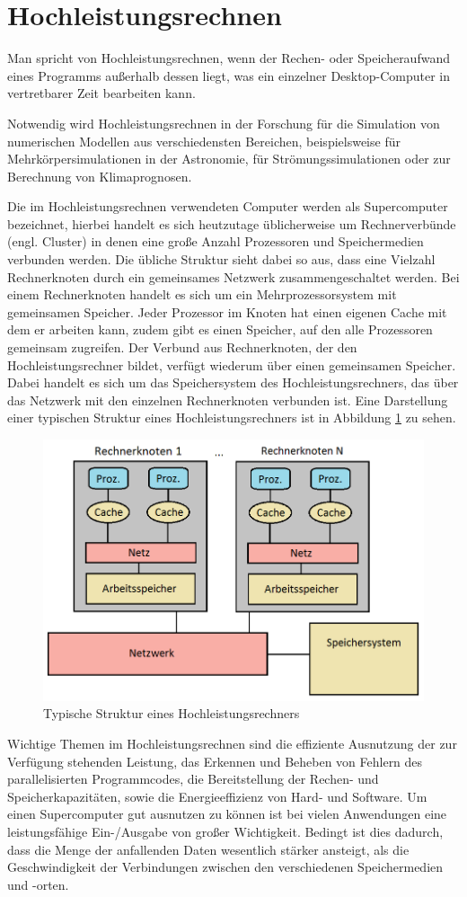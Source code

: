 \documentclass[
	12pt,
	a4paper,
	BCOR10mm,
	DIV14,
	listof=totoc,
	bibliography=totoc,
	headsepline
]{scrreprt}
\begin{document}
\section{Hochleistungsrechnen}
\label{back_hpc}
Man spricht von Hochleistungsrechnen, wenn der Rechen- oder Speicheraufwand eines Programms außerhalb dessen liegt, was ein einzelner Desktop-Computer in vertretbarer Zeit bearbeiten kann.

Notwendig wird Hochleistungsrechnen in der Forschung für die Simulation von numerischen Modellen aus verschiedensten Bereichen, beispielsweise für Mehrkörpersimulationen in der Astronomie, für Strömungssimulationen oder zur Berechnung von Klimaprognosen.

Die im Hochleistungsrechnen verwendeten Computer werden als Supercomputer bezeichnet, hierbei handelt es sich heutzutage üblicherweise um Rechnerverbünde (engl. Cluster) in denen eine große Anzahl Prozessoren und Speichermedien verbunden werden.
Die übliche Struktur sieht dabei so aus, dass eine Vielzahl Rechnerknoten durch ein gemeinsames Netzwerk zusammengeschaltet werden. Bei einem Rechnerknoten handelt es sich um ein Mehrprozessorsystem mit gemeinsamen Speicher. Jeder Prozessor im Knoten hat einen eigenen Cache mit dem er arbeiten kann, zudem gibt es einen Speicher, auf den alle Prozessoren gemeinsam zugreifen. 
Der Verbund aus Rechnerknoten, der den Hochleistungsrechner bildet, verfügt wiederum über einen gemeinsamen Speicher. Dabei handelt es sich um das Speichersystem des Hochleistungsrechners, das über das Netzwerk mit den einzelnen Rechnerknoten verbunden ist.
Eine Darstellung einer typischen Struktur eines Hochleistungsrechners ist in Abbildung \ref{fig:rechnerknoten} zu sehen.
\begin{figure}[h]
	\begin{center}
		\includegraphics[width=.43\textwidth]{Bilder/rechnerknoten.png}
	\end{center}
	\caption{Typische Struktur eines Hochleistungsrechners}
	\label{fig:rechnerknoten}
\end{figure}

Wichtige Themen im Hochleistungsrechnen sind die effiziente Ausnutzung der zur Verfügung stehenden Leistung, das Erkennen und Beheben von Fehlern des parallelisierten Programmcodes, die Bereitstellung der Rechen- und Speicherkapazitäten, sowie die Energieeffizienz von Hard- und Software.
Um einen Supercomputer gut ausnutzen zu können ist bei vielen Anwendungen eine leistungsfähige Ein-/Ausgabe von großer Wichtigkeit. Bedingt ist dies dadurch, dass die Menge der anfallenden Daten wesentlich stärker ansteigt, als die Geschwindigkeit der Verbindungen zwischen den verschiedenen Speichermedien und -orten.
\end{document}
